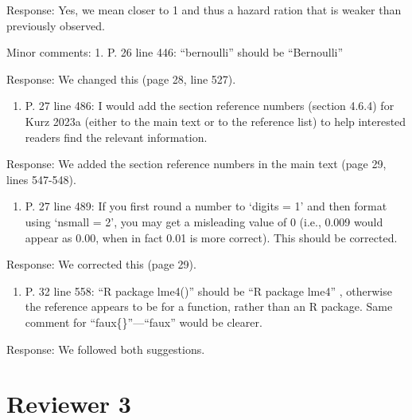 \documentclass[
]{article}
\providecommand{\tightlist}{%
  \setlength{\itemsep}{0pt}\setlength{\parskip}{0pt}}
\renewenvironment{quote}{\begin{leftbar}}{\end{leftbar}}
\begin{document}
Response: Yes, we mean closer to 1 and thus a hazard ration that is
weaker than previously observed.

\begin{quote}
Minor comments: 1. P. 26 line 446: ``bernoulli'' should be ``Bernoulli''
\end{quote}

Response: We changed this (page 28, line 527).

\begin{quote}
\begin{enumerate}
\def\labelenumi{\arabic{enumi}.}
\setcounter{enumi}{1}
\tightlist
\item
  P. 27 line 486: I would add the section reference numbers (section
  4.6.4) for Kurz 2023a (either to the main text or to the reference
  list) to help interested readers find the relevant information.
\end{enumerate}
\end{quote}

Response: We added the section reference numbers in the main text (page
29, lines 547-548).

\begin{quote}
\begin{enumerate}
\def\labelenumi{\arabic{enumi}.}
\setcounter{enumi}{2}
\tightlist
\item
  P. 27 line 489: If you first round a number to `digits = 1' and then
  format using `nsmall = 2', you may get a misleading value of 0 (i.e.,
  0.009 would appear as 0.00, when in fact 0.01 is more correct). This
  should be corrected.
\end{enumerate}
\end{quote}

Response: We corrected this (page 29).

\begin{quote}
\begin{enumerate}
\def\labelenumi{\arabic{enumi}.}
\setcounter{enumi}{3}
\tightlist
\item
  P. 32 line 558: ``R package lme4()'' should be ``R package lme4'' ,
  otherwise the reference appears to be for a function, rather than an R
  package. Same comment for ``faux\{\}''---``faux'' would be clearer.
\end{enumerate}
\end{quote}

Response: We followed both suggestions.

\section{Reviewer 3}\label{reviewer-3}
\end{document}
